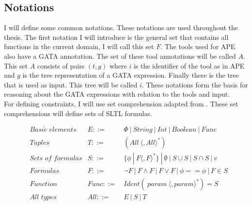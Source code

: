 \documentclass{article}
\begin{document}


\subsection{Notations}

I will define some common notations. These notations are used throughout the thesis. The first notation I will introduce is the general set that contains all functions in the current domain, I will call this set $F$. The tools used for APE also have a GATA annotation. The set of these tool annotations will be called $A$. This set $A$ consists of pairs $(t,g)$ where $i$ is the identifier of the tool as in APE and $g$ is the tree representation of a GATA expression. Finally there is the tree that is used as input. This tree will be called $i$. These notations form the basis for reasoning about the GATA expressions with relation to the tools and input.
\\

For defining constraints, I will use set comprehension adapted from \cite{veanes2008bounded}. These set comprehensions will define sets of SLTL formulas.  

\begin{align*}
&\textit{Basic elements}  & E::=&\ \Phi\ |\ String\ |\ Int\ |\ Boolean\ |\ Func    \\
&\textit{Tuples} & T::=&\ ( All\ \langle,All\rangle^*)
\\
    &\textit{Sets of formulas}  & S ::=&\ \{\phi\ |\ F\langle,F\rangle^* \}\ |\ \emptyset\ |\ S \cup S\ |\ S\cap S\ |\ v   \\
    &Formulas & F ::=&\ \neg F \ |\ F \wedge F\ |\ F \vee F\ |\ \phi == \phi \ |\ F \in S \\
    &\textit{Function} & Func ::=&\ Ident( \ param\ \langle,param\rangle^*) = S \\
    &\textit{All types} & All ::=&\ E\ |\ S\ |\ T
\end{align*}
\end{document}
